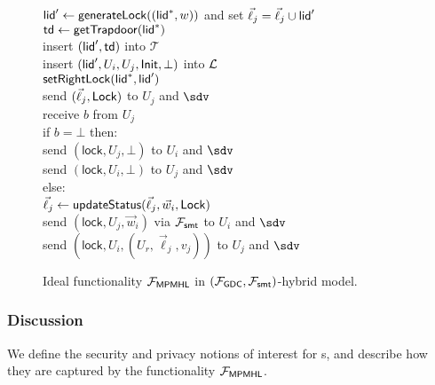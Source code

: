 \begin{figure*}[!h]
{\begin{minipage}[t]{0.45\textwidth}
{				\quad $\mathsf{lid}' \gets \mathsf{generateLock}((\mathsf{lid}^*,w))$ and set $\vec{\ell}_j = \vec{\ell}_j \cup \mathsf{lid}'$													\\
				\quad $\mathsf{td} \gets \mathsf{getTrapdoor}(\mathsf{lid}^*)$								\\
				\quad insert $(\mathsf{lid}',\mathsf{td})$ into $\mathcal{T}$								\\
				\quad insert $(\mathsf{lid}', U_i, U_j, \mathsf{Init}, \bot)$ into $\mathcal{L}$						\\
				\quad $\mathsf{setRightLock}(\mathsf{lid}^*, \mathsf{lid}')$											\\
				send $(\vec{\ell}_j, \mathsf{Lock})$ to $U_j$ and $\sdv$								\\
				receive $b$ from $U_j$														\\
				if $b = \bot$ then: 															\\
				\quad send $(\mathsf{lock},U_j,\bot)$ to $U_i$ and $\sdv$					\\
				\quad send $(\mathsf{lock},U_i,\bot)$ to $U_j$ and $\sdv$					\\	
				else:																		\\
				\quad $\vec{\ell}_j \gets \mathsf{updateStatus}(\vec{\ell}_j, \vec{w}_i, \mathsf{Lock})$	\\
				\quad send $(\mathsf{lock},U_j,\vec{w}_i)$ via $\mathcal{F}_{\mathsf{smt}}$ to $U_i$ 
				and $\sdv$																	\\
				\quad send $(\mathsf{lock},U_i,(U_r,\vec{\ell}_j,v_j))$ to $U_j$ and $\sdv$
			}
			\\
		\end{minipage}
	}
	
	\caption{Ideal functionality $\mathcal{F}_{\mathsf{MPMHL}}$ in $(\mathcal{F}_{\mathsf{GDC}}, \mathcal{F}_{\mathsf{smt}})$-hybrid model.}
	\label{fig:ideal-mpmhl}
\end{figure*}


\subsubsection{Discussion}
\label{sec:mpmhl-discussion}

We define the security and privacy notions of interest for {\sysname}s, and describe how they 
are captured by the functionality $\mathcal{F}_{\mathsf{MPMHL}}$.

